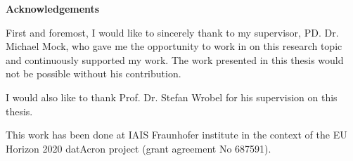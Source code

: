 

	\thispagestyle{empty}
{\noindent%
	\huge{\textbf{\textsf{Acknowledgements}}}
}
\vspace{2cm}
\begin{flushleft}
	\noindent%
	First and foremost, I would like to sincerely thank to my supervisor, PD. Dr. Michael Mock, who gave me the opportunity to work in on this research topic and continuously supported my work. The work presented in this thesis would not be possible without his contribution.
	
	 I would also like to thank Prof. Dr. Stefan Wrobel for his supervision on this thesis.  

This work has been done at IAIS Fraunhofer institute in the context of the EU Horizon 2020 datAcron project (grant agreement No 687591).
	
	
\end{flushleft}
